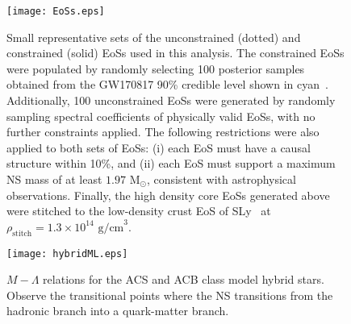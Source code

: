 \documentclass[prd,twocolumn,nofootinbib,superscriptaddress,amsmath,amssymb]{revtex4-1}
\begin{document}
\begin{figure}
\begin{center} 
\texttt{[image: EoSs.eps]}
\end{center}
\caption{
Small representative sets of the unconstrained (dotted) and constrained (solid) EoSs used in this analysis. 
The constrained EoSs were populated by randomly selecting 100 posterior samples obtained from the GW170817 90\% credible level shown in cyan~\cite{LIGO:posterior}.
Additionally, 100 unconstrained EoSs were generated by randomly sampling spectral coefficients of physically valid EoSs, with no further constraints applied.
The following restrictions were also applied to both sets of EoSs: (i) each EoS must have a causal structure within 10\%, and (ii) each EoS must support a maximum NS mass of at least $1.97 \text{ M}_{\odot}$, consistent with astrophysical observations.
Finally, the high density core EoSs generated above were stitched to the low-density crust EoS of SLy~\cite{Douchin:2001sv} at $\rho_{\text{stitch}}=1.3 \times 10^{14} \text{ g/cm}^3$.}
\label{fig:eos}
\end{figure} 

\begin{figure}
\begin{center} 
\texttt{[image: hybridML.eps]}
\end{center}
\caption{
$M-\Lambda$ relations for the ACS and ACB class model hybrid stars. 
Observe the transitional points where the NS transitions from the hadronic branch into a quark-matter branch.
}
\label{fig:hybridML}
\end{figure} 
\end{document}
